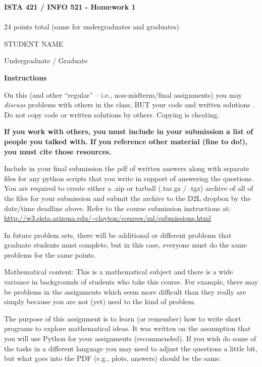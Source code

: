 \documentclass[10pt]{article}
\begin{document}
\begin{center}
    {\Large {\bf ISTA 421 / INFO 521 - Homework 1}} \\
     \\
    24 points total (same for undergraduates and graduates) \\
    \vspace{1cm}
\end{center}

\begin{flushright}
STUDENT NAME  %

Undergraduate / Graduate %
\end{flushright}

\vspace{1cm}

{\Large {\bf Instructions}}

On this (and other ``regular'' -- i.e., non-midterm/final assignments) you may {\em discuss} problems with others in the class, BUT your code and written solutions .  Do not copy code or written solutions by others.  Copying is cheating.

{\bf If you work with others, you must include in your submission a list of people you talked with.  If you reference other material (fine to do!), you must cite those resources.}

Include in your final submission the pdf of written answers along with separate files for any python scripts that you write in support of answering the questions. 
You are required to create either a .zip or tarball (.tar.gz / .tgz) archive of all of the files for your submission and submit the archive to the D2L dropbox by the date/time deadline above.
Refer to the course submission instructions at: \\
\url{http://w3.sista.arizona.edu/~clayton/courses/ml/submissions.html}

In future problem sets, there will be additional or different problems that graduate students must complete, but in this case, everyone must do the same problems for the same points.

Mathematical content: This is a mathematical subject and there is a wide variance in backgrounds of students who take this course. For example, there may be problems in the assignments which seem more difficult than they really are simply because you are not (yet) used to the kind of problem. 

The purpose of this assignment is to learn (or remember) how to write short programs to explore mathematical ideas. It was written on the assumption that you will use Python for your assignments (recommended). If you wish do some of the tasks in a different language you may need to adjust the questions a little bit, but what goes into the PDF (e.g., plots, answers) should be the same. 
\end{document}
